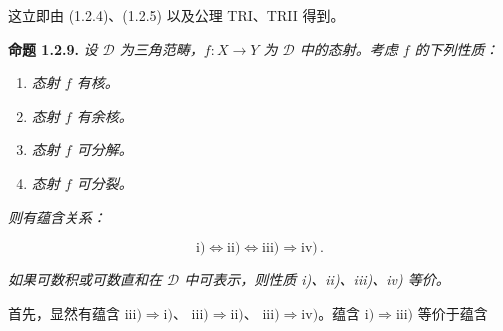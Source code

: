 这立即由 (1.2.4)、(1.2.5) 以及公理 TRI、TRII 得到。

\medskip
\noindent\textbf{命题 1.2.9.}\quad
\emph{设 $\mathcal D$ 为三角范畴，$f\colon X\longrightarrow Y$ 为
$\mathcal D$ 中的态射。考虑 $f$ 的下列性质：}

\begin{enumerate}
\renewcommand{\labelenumi}{\roman{enumi})}
\item \emph{态射 $f$ 有核。}
\item \emph{态射 $f$ 有余核。}
\item \emph{态射 $f$ 可分解。}
\item \emph{态射 $f$ 可分裂。}
\end{enumerate}

\noindent\emph{则有蕴含关系：}

\[
  \mathrm{i)}\Longleftrightarrow\mathrm{ii)}
  \Longleftrightarrow\mathrm{iii)}\Longrightarrow\mathrm{iv)}\,.
\]

\emph{如果可数积或可数直和在 $\mathcal D$ 中可表示，则性质
\textnormal{i)}、\textnormal{ii)}、\textnormal{iii)}、\textnormal{iv)}
等价。}

首先，显然有蕴含
$\mathrm{iii)}\Longrightarrow\mathrm{i)}$、
$\mathrm{iii)}\Longrightarrow\mathrm{ii)}$、
$\mathrm{iii)}\Longrightarrow\mathrm{iv)}$。蕴含
$\mathrm{i)}\Longrightarrow\mathrm{iii)}$ 等价于蕴含
\endgroup
